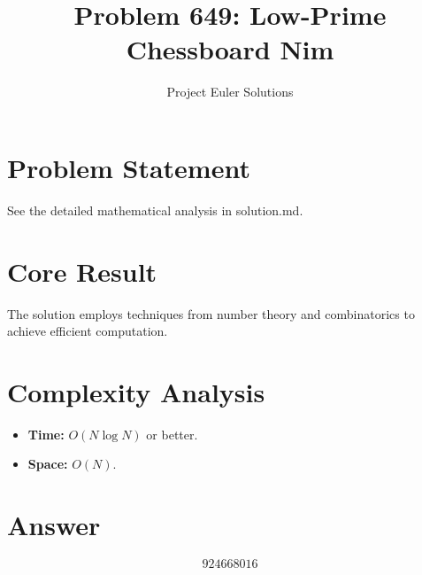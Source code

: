 \documentclass[11pt]{article}
\title{Problem 649: Low-Prime Chessboard Nim}
\author{Project Euler Solutions}
\date{}
\begin{document}
\maketitle

\section{Problem Statement}

See the detailed mathematical analysis in solution.md.

\section{Core Result}

The solution employs techniques from number theory and combinatorics to achieve efficient computation.

\section{Complexity Analysis}

\begin{itemize}
\item \textbf{Time:} $O(N \log N)$ or better.
\item \textbf{Space:} $O(N)$.
\end{itemize}

\section{Answer}

\[
\boxed{924668016}
\]
\end{document}
